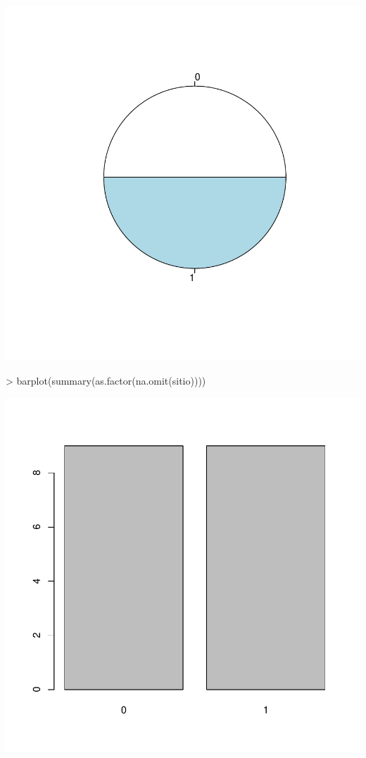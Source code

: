 \documentclass[12pt]{article}
\begin{document}
\includegraphics{ensayo-017}
\begin{Schunk}
\begin{Sinput}
> barplot(summary(as.factor(na.omit(sitio))))
\end{Sinput}
\end{Schunk}
\includegraphics{ensayo-018}
\end{document}
